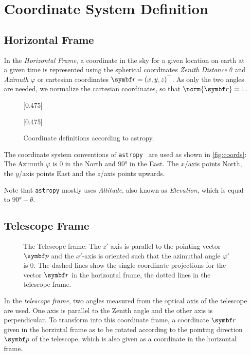 \documentclass[DIV=15]{scrartcl}
\newcommand\azimuth{\ensuremath{\varphi}}
\newcommand\zenith{\ensuremath{\theta}}
\DeclarePairedDelimiter\norm\lVert\rVert
\begin{document}
\section{Coordinate System Definition}

\subsection{Horizontal Frame}

In the \emph{Horizontal Frame}, a coordinate in the sky for a given location on earth at a given 
time is represented using the spherical coordinates \emph{Zenith Distance} \zenith{} and \emph{Azimuth} \azimuth{} or cartesian coordinates $\v{r} = (x, y, z)^\top$.
As only the two angles are needed, we normalize the cartesian coordinates, so that $\norm{\v{r}} = 1$.

\begin{figure}[htpb]
  \centering
  [0.475\textwidth]{%
    
  }
  \hfill
  [0.475\textwidth]{%
    
  }
  \caption{Coordinate definitions according to astropy.}\label{fig:coords}
\end{figure}

The coordinate system conventions of \texttt{astropy}~\cite{astropy, astropy-coords} are used as shown in \autoref{fig:coords}:
The Azimuth \azimuth{} is $0$ in the North and \ang{90} in the East.
The $x$\-/axis points North, the $y$\-/axis points East and the $z$\-/axis points upwards.

Note that \texttt{astropy} mostly uses \emph{Altitude}, also known as \emph{Elevation}, which is equal to $\ang{90} - \zenith$.

\subsection{Telescope Frame}
\begin{figure}
  \begin{captionbeside}{%
    The Telescope frame: The $z'$-axis is parallel to the pointing vector $\v{p}$ and
    the $x'$-axis is oriented such that the azimuthal angle $\azimuth'$ is
    $0$. 
    The dashed lines show the single coordinate projections for the vector $\v{r}$ in
    the horizontal frame, the dotted lines in the telescope frame.
  }%
    
  \end{captionbeside}\label{fig:fact-sensorplane}
\end{figure}
In the \emph{telescope frame}, two angles measured from the optical axis of the telescope are used. One axis is parallel to the Zenith angle and the other axis is perpendicular. 
To transform into this coordinate frame, a coordinate $\v{r}$ given in the horzintal frame as to be rotated according to the pointing direction $\v{p}$ of the telescope,
which is also given as a coordinate in the horizontal frame.
\end{document}
